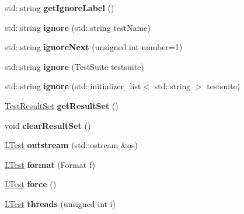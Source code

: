 \begin{DoxyCompactItemize}
\item 
\hypertarget{class_l_test_aeda4f85ee38a321d576295b522426404}{std\-::string {\bfseries get\-Ignore\-Label} ()}\label{class_l_test_aeda4f85ee38a321d576295b522426404}

\item 
\hypertarget{class_l_test_abd880602b9f70c354d9b4f7f03fd2db3}{std\-::string {\bfseries ignore} (std\-::string test\-Name)}\label{class_l_test_abd880602b9f70c354d9b4f7f03fd2db3}

\item 
\hypertarget{class_l_test_aadae23b9eb83ea190f3696d2909b207f}{std\-::string {\bfseries ignore\-Next} (unsigned int number=1)}\label{class_l_test_aadae23b9eb83ea190f3696d2909b207f}

\item 
\hypertarget{class_l_test_a741d71ba4bca01371ab2e7878f27c7e3}{std\-::string {\bfseries ignore} (Test\-Suite testsuite)}\label{class_l_test_a741d71ba4bca01371ab2e7878f27c7e3}

\item 
\hypertarget{class_l_test_a15dd9f53a04b00c25e900f50de948da3}{std\-::string {\bfseries ignore} (std\-::initializer\-\_\-list$<$ std\-::string $>$ testsuite)}\label{class_l_test_a15dd9f53a04b00c25e900f50de948da3}

\item 
\hypertarget{class_l_test_a60b76a64df902355b4b16cddaf8f2995}{\hyperlink{class_l_test_source_1_1_result_set_3_01_test_result_01_4}{Test\-Result\-Set} {\bfseries get\-Result\-Set} ()}\label{class_l_test_a60b76a64df902355b4b16cddaf8f2995}

\item 
\hypertarget{class_l_test_a565cd4d771557154e0cf605c76933f80}{void {\bfseries clear\-Result\-Set} ()}\label{class_l_test_a565cd4d771557154e0cf605c76933f80}

\item 
\hypertarget{class_l_test_a254d051e64ecb7c904d9a1ea12b3744c}{\hyperlink{class_l_test}{L\-Test} {\bfseries outstream} (std\-::ostream \&os)}\label{class_l_test_a254d051e64ecb7c904d9a1ea12b3744c}

\item 
\hypertarget{class_l_test_a2feab84f63a7600cbb071c0db36d7392}{\hyperlink{class_l_test}{L\-Test} {\bfseries format} (Format f)}\label{class_l_test_a2feab84f63a7600cbb071c0db36d7392}

\item 
\hypertarget{class_l_test_aa903ccfc2e0125edadddabb48d1fac0f}{\hyperlink{class_l_test}{L\-Test} {\bfseries force} ()}\label{class_l_test_aa903ccfc2e0125edadddabb48d1fac0f}

\item 
\hypertarget{class_l_test_ae184e94d4ff5ae96dc247121ac9b0e7f}{\hyperlink{class_l_test}{L\-Test} {\bfseries threads} (unsigned int i)}\label{class_l_test_ae184e94d4ff5ae96dc247121ac9b0e7f}

\end{DoxyCompactItemize}
